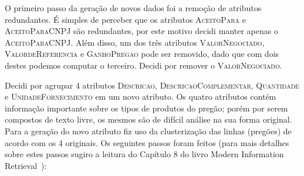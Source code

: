\documentclass[brazil,a4paper,12pt]{article}
\begin{document}
O primeiro passo da geração de novos dados foi a remoção de atributos redundantes. É simples de perceber que os atributos \textsc{AceitoPara} e \textsc{AceitoParaCNPJ} são redundantes, por este motivo decidi manter apenas o \textsc{AceitoParaCNPJ}. Além disso, um dos três atributos \textsc{ValorNegociado}, \textsc{ValordeReferencia} e \textsc{GanhoPregao} pode ser removido, dado que com dois destes podemos computar o terceiro. Decidi por remover o \textsc{ValorNegociado}.

Decidi por agrupar 4 atributos \textsc{Descricao}, \textsc{DescricaoComplementar}, \textsc{Quantidade} e  \textsc{UnidadeFornecimento} em um novo atributo. Os quatro atributos contém informação importante sobre os tipos de produtos do pregão; porém por serem compostos de texto livre, os mesmos são de difícil análise na sua forma original. Para a geração do novo atributo fiz uso da clusterização das linhas (pregões) de acordo com os 4 originais. Os seguintes passos foram feitos (para mais detalhes sobre estes passos sugiro a leitura do Capítulo 8 do livro Modern Information Retrieval~\cite{baeza2010modern}):
\end{document}
